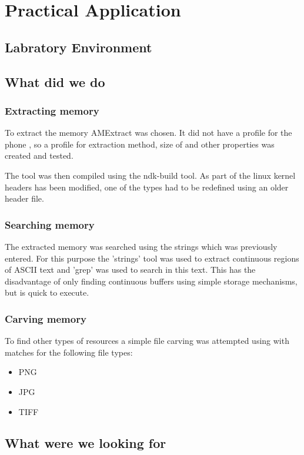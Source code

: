 \section{Practical Application}
\lipsum[1-2]
\subsection{Labratory Environment}
\lipsum[4-5]
\subsection{What did we do}
\lipsum[6]

\subsubsection{Extracting memory}
To extract the memory AMExtract was chosen. %
 It did not have a profile for the phone %
 , so a profile for extraction method, size of %
 and other properties was created and tested.
 
 The tool was then compiled using the ndk-build tool. As part of the linux kernel headers has been modified, one of the types had to be redefined using an older header file.

\subsubsection{Searching memory}
The extracted memory was searched using the strings which was previously entered. For this purpose the 'strings' tool was used to extract continuous regions of ASCII text and 'grep' was used to search in this text. This has the disadvantage of only finding continuous buffers using simple storage mechanisms, but is quick to execute.

\subsubsection{Carving memory}
To find other types of resources a simple file carving was attempted using %
with matches for the following file types:
\begin{itemize}
	\item PNG
	\item JPG
	\item TIFF
\end{itemize}

\subsection{What were we looking for}
\lipsum[7]